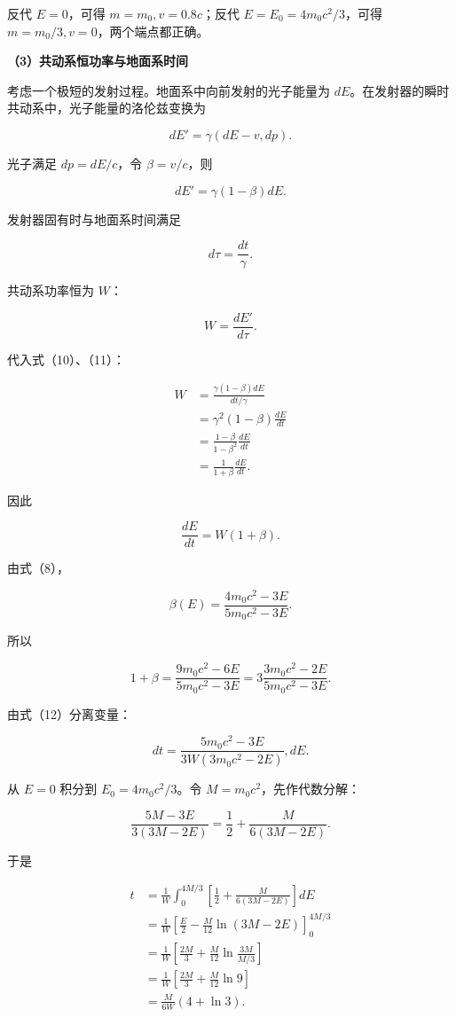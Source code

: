 \documentclass[12pt,a4paper,UTF8]{ctexart}
\begin{document}
反代 \(E=0\)，可得 \(m=m_0,v=0.8c\)；反代 \(E=E_0=4m_0c^2/3\)，可得
\(m=m_0/3,v=0\)，两个端点都正确。

\textbf{（3）共动系恒功率与地面系时间}

考虑一个极短的发射过程。地面系中向前发射的光子能量为
\(dE\)。在发射器的瞬时共动系中，光子能量的洛伦兹变换为

\[
dE'=\gamma(dE-v,dp).
\]

光子满足 \(dp=dE/c\)，令 \(\beta=v/c\)，则

\[
dE'=\gamma(1-\beta)dE.
\tag{10}
\]

发射器固有时与地面系时间满足

\[
d\tau=\frac{dt}{\gamma}.
\tag{11}
\]

共动系功率恒为 \(W\)：

\[
W=\frac{dE'}{d\tau}.
\]

代入式（10）、（11）：

\[
\begin{aligned}
W
&=\frac{\gamma(1-\beta)dE}{dt/\gamma}\\
&=\gamma^2(1-\beta)\frac{dE}{dt}\\
&=\frac{1-\beta}{1-\beta^2}\frac{dE}{dt}\\
&=\frac1{1+\beta}\frac{dE}{dt}.
\end{aligned}
\]

因此

\[
\frac{dE}{dt}=W(1+\beta).
\tag{12}
\]

由式（8），

\[
\beta(E)=\frac{4m_0c^2-3E}{5m_0c^2-3E}.
\]

所以

\[
1+\beta
=\frac{9m_0c^2-6E}{5m_0c^2-3E}
=3\frac{3m_0c^2-2E}{5m_0c^2-3E}.
\]

由式（12）分离变量：

\[
dt
=\frac{5m_0c^2-3E}{3W(3m_0c^2-2E)},dE.
\tag{13}
\]

从 \(E=0\) 积分到 \(E_0=4m_0c^2/3\)。令 \(M=m_0c^2\)，先作代数分解：

\[
\frac{5M-3E}{3(3M-2E)}
=\frac12+\frac{M}{6(3M-2E)}.
\tag{14}
\]

于是

\[
\begin{aligned}
t
&=\frac1W\int_0^{4M/3}
\left[\frac12+\frac{M}{6(3M-2E)}\right]dE\\
&=\frac1W\left[
\frac E2-\frac{M}{12}\ln(3M-2E)
\right]_0^{4M/3}\\
&=\frac1W\left[
\frac{2M}{3}+\frac{M}{12}\ln\frac{3M}{M/3}
\right]\\
&=\frac1W\left[
\frac{2M}{3}+\frac{M}{12}\ln9
\right]\\
&=\frac{M}{6W}(4+\ln3).
\end{aligned}
\]
\end{document}
